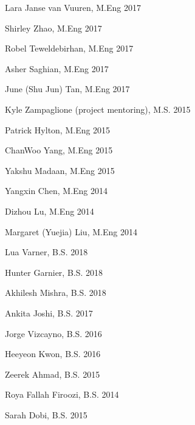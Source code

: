 \documentclass[letterpaper]{deedy-resume} %
\begin{document}

\begin{minipage}[t]{0.5\textwidth}

{}

\begin{tightitemize}

\item Lara Janse van Vuuren, M.Eng 2017
\item Shirley Zhao, M.Eng 2017
\item Robel Teweldebirhan, M.Eng 2017
\item Asher Saghian, M.Eng 2017
\item June (Shu Jun) Tan, M.Eng 2017
\item Kyle Zampaglione (project mentoring), M.S. 2015
\item Patrick Hylton, M.Eng 2015
\item ChanWoo Yang, M.Eng 2015
\item Yakshu Madaan, M.Eng 2015
\item Yangxin Chen, M.Eng 2014
\item Dizhou Lu, M.Eng 2014
\item Margaret (Yuejia) Liu, M.Eng 2014

\end{tightitemize}

\end{minipage}%
\begin{minipage}[t]{0.5\textwidth}

  \vspace{0.05cm}
  
{}

\begin{tightitemize}

\item Lua Varner,  B.S. 2018
\item Hunter Garnier, B.S. 2018
\item Akhilesh Mishra, B.S. 2018
\item Ankita Joshi, B.S. 2017
\item Jorge Vizcayno, B.S. 2016
\item Heeyeon Kwon, B.S. 2016
\item Zeerek Ahmad, B.S. 2015
\item Roya Fallah Firoozi, B.S. 2014
\item Sarah Dobi, B.S. 2015


\end{tightitemize}

\end{minipage}
\end{document}
